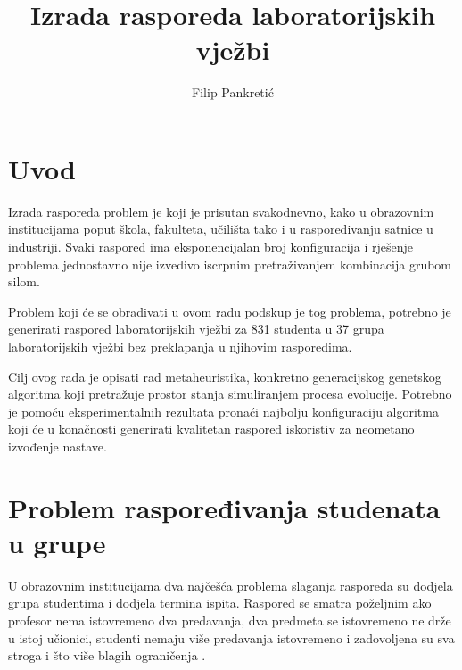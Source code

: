 \documentclass[times, utf8, zavrsni]{fer}
\begin{document}

\title{Izrada rasporeda laboratorijskih vježbi}

\author{Filip Pankretić}

\maketitle

\izvornik


\tableofcontents
\listoffigures

\chapter{Uvod}

Izrada rasporeda problem je koji je prisutan svakodnevno, kako u obrazovnim institucijama poput škola, fakulteta, učilišta tako i u raspoređivanju satnice u industriji. Svaki raspored ima eksponencijalan broj konfiguracija i rješenje problema jednostavno nije izvedivo iscrpnim pretraživanjem kombinacija grubom silom.

Problem koji će se obrađivati u ovom radu podskup je tog problema, potrebno je generirati raspored laboratorijskih vježbi za 831 studenta u 37 grupa laboratorijskih vježbi bez preklapanja u njihovim rasporedima.

Cilj ovog rada je opisati rad metaheuristika, konkretno generacijskog genetskog algoritma koji pretražuje prostor stanja simuliranjem procesa evolucije. Potrebno je pomoću eksperimentalnih rezultata pronaći najbolju konfiguraciju algoritma koji će u konačnosti generirati kvalitetan raspored iskoristiv za neometano izvođenje nastave.

\chapter{Problem raspoređivanja studenata u grupe}

U obrazovnim institucijama dva najčešća problema slaganja rasporeda su dodjela grupa studentima i dodjela termina ispita. Raspored se smatra poželjnim ako profesor nema istovremeno dva predavanja, dva predmeta se istovremeno ne drže u istoj učionici, studenti nemaju više predavanja istovremeno i zadovoljena su sva stroga i što više blagih ograničenja \citep{ganguli2017study}.
\end{document}
